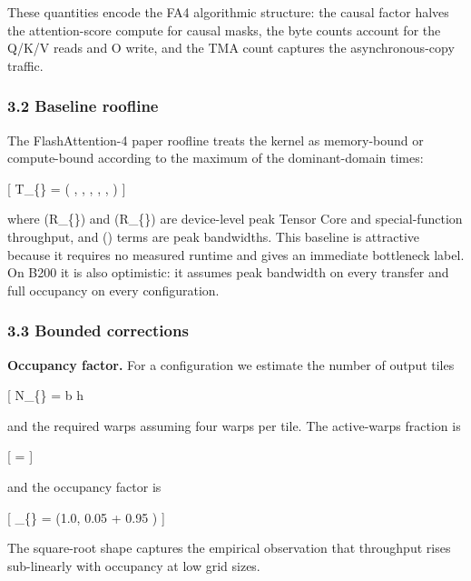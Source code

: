 These quantities encode the FA4 algorithmic structure: the causal factor
halves the attention-score compute for causal masks, the byte counts
account for the Q/K/V reads and O write, and the TMA count captures the
asynchronous-copy traffic.

\subsubsection{3.2 Baseline roofline}\label{baseline-roofline}

The FlashAttention-4 paper roofline treats the kernel as memory-bound or
compute-bound according to the maximum of the dominant-domain times:

{[} T\_\{\} = \max\left(
, ,
,
,
,
 \right) {]}

where (R\_\{\}) and (R\_\{\}) are device-level peak
Tensor Core and special-function throughput, and (\beta) terms are peak
bandwidths. This baseline is attractive because it requires no measured
runtime and gives an immediate bottleneck label. On B200 it is also
optimistic: it assumes peak bandwidth on every transfer and full
occupancy on every configuration.

\subsubsection{3.3 Bounded corrections}\label{bounded-corrections}

\textbf{Occupancy factor.} For a configuration we estimate the number of
output tiles

{[} N\_\{\} = b \cdot h \cdot \left\lceil {}
\right\rceil \cdot \left\lceil {} \right\rceil {]}

and the required warps assuming four warps per tile. The active-warps
fraction is

{[} \rho =
{]}

and the occupancy factor is

{[} \eta\_\{\} = \min\left(1.0, 0.05 + 0.95 \sqrt{\rho}\right)
{]}

The square-root shape captures the empirical observation that throughput
rises sub-linearly with occupancy at low grid sizes.

